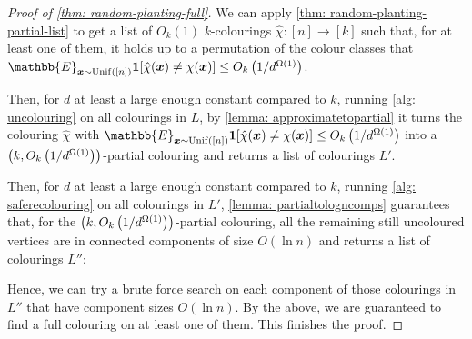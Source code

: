 \begin{proof}[Proof of \cref{thm: random-planting-full}]
    We can apply \cref{thm: random-planting-partial-list} to get a list of $O_{k}(1)$ $k$-colourings $\hat{\chi}: [n] \to [k]$ such that, for at least one of them, it holds up to a permutation of the colour classes that $\mathbb{E}_{\bm{x} \sim \operatorname{Unif}([n])} \1[\hat\chi(\bm{x}) \neq \chi(\bm{x})] \leq O_k\Paren{1/d^{\Omega(1)}}$.

    Then, for $d$ at least a large enough constant compared to $k$, running \cref{alg: uncolouring} on all colourings in $L$, by \cref{lemma: approximatetopartial} it turns the colouring $\hat{\chi}$ with $\mathbb{E}_{\bm{x} \sim \operatorname{Unif}([n])} \1[\hat\chi(\bm{x}) \neq \chi(\bm{x})] \leq O_k\Paren{1/d^{\Omega(1)}}$ into a $\left(k, O_k\left(1/d^{\Omega(1)}\right)\right)$-partial colouring and returns a list of colourings $L'$. %

    Then, for $d$ at least a large enough constant compared to $k$, running \cref{alg: saferecolouring} on all colourings in $L'$, \cref{lemma: partialtologncomps} guarantees that, for the $\left(k, O_k\left(1/d^{\Omega(1)}\right)\right)$-partial colouring, all the remaining still uncoloured vertices are in connected components of size $O(\ln{n})$ and returns a list of colourings $L''$:

    Hence, we can try a brute force search on each component of those colourings in $L''$ that have component sizes $O(\ln{n})$. By the above, we are guaranteed to find a full colouring on at least one of them. This finishes the proof.
\end{proof}
